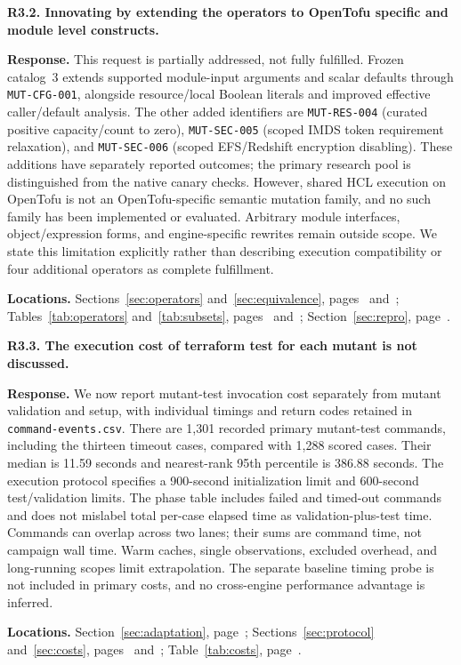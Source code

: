 \medskip
\noindent\textbf{R3.2. Innovating by extending the operators to OpenTofu specific and module level constructs.}\label{response:R3.2}\par
\textbf{Response.} This request is partially addressed, not fully fulfilled. Frozen catalog~3 extends supported module-input arguments and scalar defaults through \texttt{MUT-CFG-001}, alongside resource/local Boolean literals and improved effective caller/default analysis. The other added identifiers are \texttt{MUT-RES-004} (curated positive capacity/count to zero), \texttt{MUT-SEC-005} (scoped IMDS token requirement relaxation), and \texttt{MUT-SEC-006} (scoped EFS/Redshift encryption disabling). These additions have separately reported outcomes; the primary research pool is distinguished from the native canary checks. However, shared HCL execution on OpenTofu is not an OpenTofu-specific semantic mutation family, and no such family has been implemented or evaluated. Arbitrary module interfaces, object/expression forms, and engine-specific rewrites remain outside scope. We state this limitation explicitly rather than describing execution compatibility or four additional operators as complete fulfillment.\par
\textbf{Locations.} Sections~\ref{sec:operators} and~\ref{sec:equivalence}, pages~\pageref{sec:operators} and~\pageref{sec:equivalence}; Tables~\ref{tab:operators} and~\ref{tab:subsets}, pages~\pageref{tab:operators} and~\pageref{tab:subsets}; Section~\ref{sec:repro}, page~\pageref{sec:repro}.

\medskip
\noindent\textbf{R3.3. The execution cost of terraform test for each mutant is not discussed.}\label{response:R3.3}\par
\textbf{Response.} We now report mutant-test invocation cost separately from mutant validation and setup, with individual timings and return codes retained in \texttt{command-events.csv}. There are 1,301 recorded primary mutant-test commands, including the thirteen timeout cases, compared with 1,288 scored cases. Their median is 11.59 seconds and nearest-rank 95th percentile is 386.88 seconds. The execution protocol specifies a 900-second initialization limit and 600-second test/validation limits. The phase table includes failed and timed-out commands and does not mislabel total per-case elapsed time as validation-plus-test time. Commands can overlap across two lanes; their sums are command time, not campaign wall time. Warm caches, single observations, excluded overhead, and long-running scopes limit extrapolation. The separate baseline timing probe is not included in primary costs, and no cross-engine performance advantage is inferred.\par
\textbf{Locations.} Section~\ref{sec:adaptation}, page~\pageref{sec:adaptation}; Sections~\ref{sec:protocol} and~\ref{sec:costs}, pages~\pageref{sec:protocol} and~\pageref{sec:costs}; Table~\ref{tab:costs}, page~\pageref{tab:costs}.

